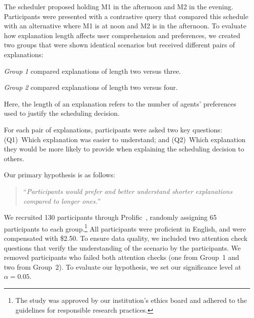 \documentclass[twoside,11pt]{article}
\begin{document}
The scheduler proposed holding M1 in the afternoon and M2 in the evening. Participants were presented with a contrastive query that compared this schedule with an alternative where M1 is at noon and M2 is in the afternoon. To evaluate how explanation length affects user comprehension and preferences, we created two groups that were shown identical scenarios but received different pairs of explanations: 
\squishlist
    \item \textit{Group 1} compared explanations of length two versus three.
    \item \textit{Group 2} compared explanations of length two versus four.
\squishend

Here, the length of an explanation refers to the number of agents' preferences used to justify the scheduling decision.


For each pair of explanations, participants were asked two key questions: (Q1)~Which explanation was easier to understand; and (Q2)~Which explanation they would be more likely to provide when explaining the scheduling decision to others. 

Our primary hypothesis is as follows:

\begin{quote}
    ``\emph{Participants would prefer and better understand shorter explanations compared to longer ones.}''
\end{quote}






 We recruited 130 participants through Prolific~\cite{palan2018prolific}, randomly assigning 65 participants to each group.\footnote{The study was approved by our institution's ethics board and adhered to the guidelines for responsible research practices.} All participants were proficient in English, and were compensated with \$2.50. To ensure data quality, we included two attention check questions that verify the understanding of the scenario by the participants. We removed participants who failed both attention checks (one from Group~1 and two from Group~2). To evaluate our hypothesis, we set our significance level at $\alpha = 0.05$.
\end{document}
